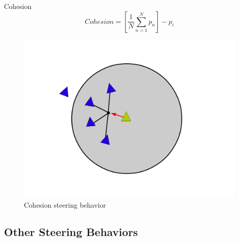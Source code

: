 \documentclass[red]{beamer}
\begin{document}
\begin{frame}{Cohesion}
	\begin{equation}
	\label{cohesionEquation}
	Cohesion = \left[  \frac{1}{N} \sum_{n=1}^{N} p_n \right ] - p_i
	\end{equation}
	
	\begin{figure}[htbp]
	\begin{center}
	\includegraphics[scale=0.15]{../figures/cohesion.pdf}
	\caption{Cohesion steering behavior}
	\label{cohesion}
	\end{center}
	\end{figure}
\end{frame}

\subsection{Other Steering Behaviors}
\end{document}
